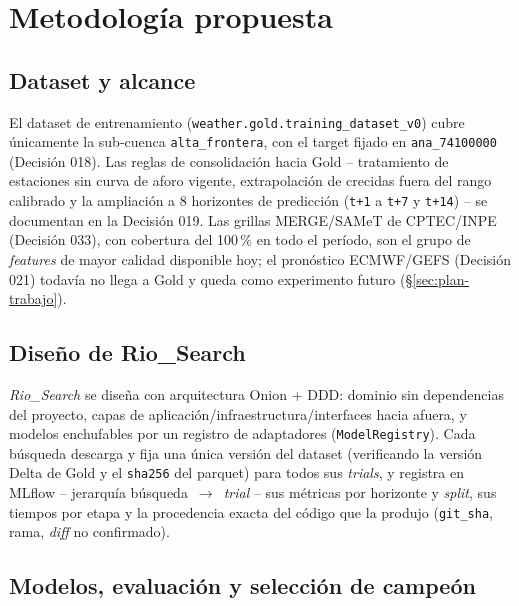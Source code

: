\chapter{Metodolog\'ia propuesta}
\label{chap:metodologia}

\section{Dataset y alcance}

El dataset de entrenamiento (\texttt{weather.gold.training\_dataset\_v0}) cubre \'unicamente la
sub-cuenca \texttt{alta\_frontera}, con el target fijado en \texttt{ana\_74100000} (Decisi\'on
018). Las reglas de consolidaci\'on hacia Gold -- tratamiento de estaciones sin curva de aforo
vigente, extrapolaci\'on de crecidas fuera del rango calibrado y la ampliaci\'on a 8 horizontes de
predicci\'on (\texttt{t+1} a \texttt{t+7} y \texttt{t+14}) -- se documentan en la Decisi\'on 019.
Las grillas MERGE/SAMeT de CPTEC/INPE (Decisi\'on 033), con cobertura del 100\,\% en todo el
per\'iodo, son el grupo de \emph{features} de mayor calidad disponible hoy; el pron\'ostico
ECMWF/GEFS (Decisi\'on 021) todav\'ia no llega a Gold y queda como experimento futuro
(\S\ref{sec:plan-trabajo}).

\section{Dise\~no de Rio\_Search}

\emph{Rio\_Search} se dise\~na con arquitectura Onion + DDD: dominio sin dependencias del
proyecto, capas de aplicaci\'on/infraestructura/interfaces hacia afuera, y modelos enchufables por
un registro de adaptadores (\texttt{ModelRegistry}). Cada b\'usqueda descarga y fija una \'unica
versi\'on del dataset (verificando la versi\'on Delta de Gold y el \texttt{sha256} del parquet)
para todos sus \emph{trials}, y registra en MLflow -- jerarqu\'ia b\'usqueda~$\to$~\emph{trial} --
sus m\'etricas por horizonte y \emph{split}, sus tiempos por etapa y la procedencia exacta del
c\'odigo que la produjo (\texttt{git\_sha}, rama, \emph{diff} no confirmado).

\section{Modelos, evaluaci\'on y selecci\'on de campe\'on}

